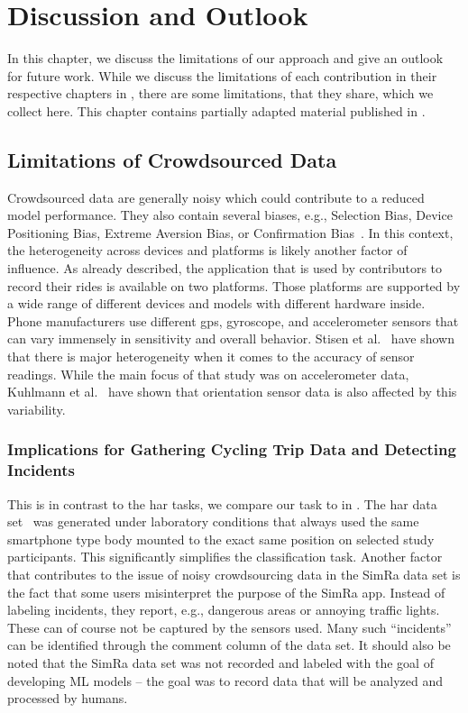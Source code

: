 \chapter{Discussion and Outlook}
\label{cha:discussion_and_outlook}
In this chapter, we discuss the limitations of our approach and give an outlook for future work.
While we discuss the limitations of each contribution in their respective chapters in , there are some limitations, that they share, which we collect here.
This chapter contains partially adapted material published in \cite{karakaya2020simra,karakaya2022cyclesense,karakaya2022realistic,karakaya2023achieving,karakaya2023crowdsensing}.

\section{Limitations of Crowdsourced Data}
\label{sec:limitations_of_crowdsourced_data}
Crowdsourced data are generally noisy which could contribute to a reduced model performance.
They also contain several biases, e.g., Selection Bias, Device Positioning Bias, Extreme Aversion Bias, or Confirmation Bias~\cite{basiri2019crowdsourced, chakraborty2017makes, kahneman1991anomalies}.
In this context, the heterogeneity across devices and platforms is likely another factor of influence.
As already described, the application that is used by contributors to record their rides is available on two platforms. 
Those platforms are supported by a wide range of different devices and models with different hardware inside. 
Phone manufacturers use different \ac{gps}, gyroscope, and accelerometer sensors that can vary immensely in sensitivity and overall behavior.
Stisen et al.~\cite{stisen2015smart} have shown that there is major heterogeneity when it comes to the accuracy of sensor readings. 
While the main focus of that study was on accelerometer data, Kuhlmann et al.~\cite{kuhlmann2021smartphone} have shown that orientation sensor data is also affected by this variability.
\subsection*{Implications for Gathering Cycling Trip Data and Detecting Incidents}
This is in contrast to the \ac{har} tasks, we compare our task to in .
The \ac{har} data set~\cite{anguita2013public} was generated under laboratory conditions that always used the same smartphone type body mounted to the exact same position on selected study participants.
This significantly simplifies the classification task.
Another factor that contributes to the issue of noisy crowdsourcing data in the SimRa data set is the fact that some users misinterpret the purpose of the SimRa app.
Instead of labeling incidents, they report, e.g., dangerous areas or annoying traffic lights.
These can of course not be captured by the sensors used.
Many such ``incidents'' can be identified through the comment column of the data set.
It should also be noted that the SimRa data set was not recorded and labeled with the goal of developing ML models -- the goal was to record data that will be analyzed and processed by humans.

